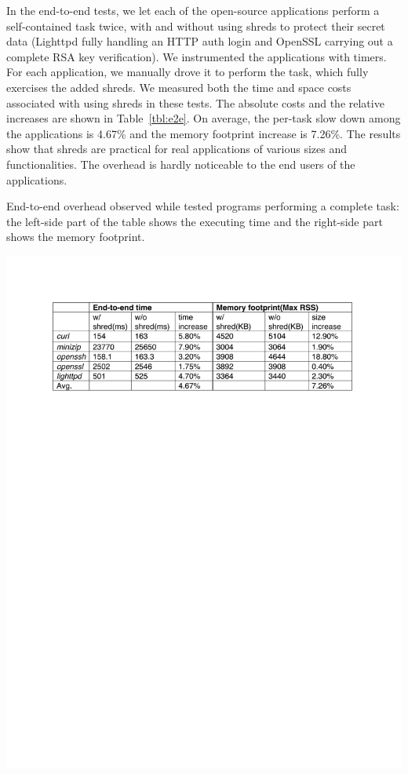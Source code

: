 In the end-to-end tests, we let each of the \numopensource open-source applications perform a self-contained task twice, with and without using shreds to protect their secret data (\eg Lighttpd fully handling an HTTP auth login and OpenSSL carrying out a complete RSA key verification). 
We instrumented the applications with timers. For each application, we manually drove it to perform the task, which fully exercises the added shreds. 
We measured both the time and space costs associated with using shreds in these tests. The absolute costs and the relative increases are shown in Table~\ref{tbl:e2e}.
On average, the per-task slow down among the applications is 4.67\% and the memory footprint increase is 7.26\%. 
The results show that shreds are practical for real applications of various sizes and functionalities. The overhead is hardly noticeable to the end users of the applications. 


\begin{table}[t]
\begin{center}
\caption{End-to-end overhead observed while tested programs performing a complete task: the left-side part of the table shows the executing time and the right-side part shows the memory footprint.}
\label{tbl:e2e}
\includegraphics[scale=0.7]{shreds/figures/runtimeoverhead}
\end{center}
\end{table}

